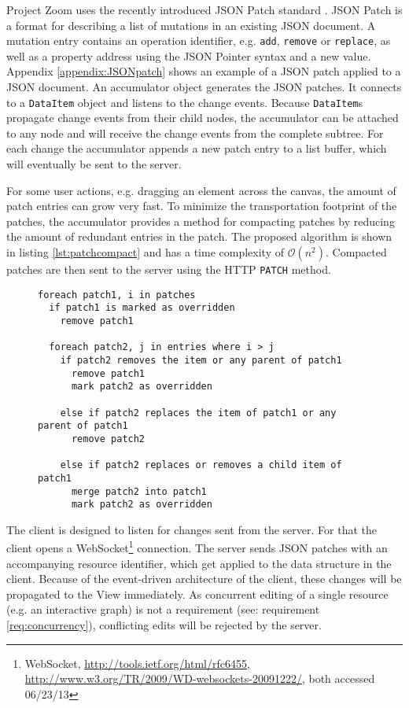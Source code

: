 Project Zoom uses the recently introduced JSON Patch standard \cite{RFC6902}. JSON Patch is a format for describing a list of mutations in an existing JSON document. A mutation entry contains an operation identifier, e.g. \texttt{add}, \texttt{remove} or \texttt{replace}, as well as a property address using the JSON Pointer syntax and a new value. Appendix \ref{appendix:JSONpatch} shows an example of a JSON patch applied to a JSON document. 
An accumulator object generates the JSON patches. It connects to a \texttt{DataItem} object and listens to the change events. Because \texttt{DataItem}s propagate change events from their child nodes, the accumulator can be attached to any node and will receive the change events from the complete subtree. For each change the accumulator appends a new patch entry to a list buffer, which will eventually be sent to the server.

For some user actions, e.g. dragging an element across the canvas, the amount of patch entries can grow very fast. To minimize the transportation footprint of the patches, the accumulator provides a method for compacting patches by reducing the amount of redundant entries in the patch. The proposed algorithm is shown in listing \ref{lst:patchcompact} and has a time complexity of $\mathcal O(n^2)$. Compacted patches are then sent to the server using the HTTP \texttt{PATCH} method.

\begin{figure}
\begin{lstlisting}[language=pseudo,caption={Pseudo code for compacting a chronologically ordered list of JSON patches},label={lst:patchcompact}]
foreach patch1, i in patches
  if patch1 is marked as overridden
    remove patch1
  
  foreach patch2, j in entries where i > j
    if patch2 removes the item or any parent of patch1
      remove patch1
      mark patch2 as overridden
      
    else if patch2 replaces the item of patch1 or any parent of patch1
      remove patch2
     
    else if patch2 replaces or removes a child item of patch1
      merge patch2 into patch1
      mark patch2 as overridden    
\end{lstlisting}
\end{figure}

The client is designed to listen for changes sent from the server. For that the client opens a WebSocket\footnote{WebSocket, \url{http://tools.ietf.org/html/rfc6455}, \url{http://www.w3.org/TR/2009/WD-websockets-20091222/}, both accessed 06/23/13} connection. The server sends JSON patches with an accompanying resource identifier, which get applied to the data structure in the client. Because of the event-driven architecture of the client, these changes will be propagated to the View immediately. As concurrent editing of a single resource (e.g. an interactive graph) is not a requirement (see: requirement \ref{req:concurrency}), conflicting edits will be rejected by the server.

